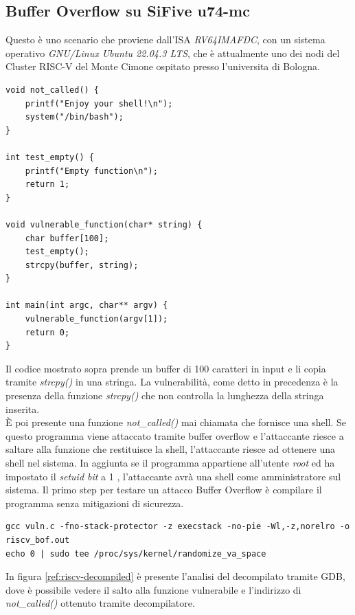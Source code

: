 \subsection*{Buffer Overflow su SiFive u74-mc}
Questo è uno scenario che proviene dall'ISA \textit{RV64IMAFDC}, con un sistema operativo \textit{GNU/Linux Ubuntu 22.04.3 LTS}, che è attualmente uno dei nodi del Cluster RISC-V del Monte Cimone ospitato presso l'universita di Bologna\cite{mcimone}.\\
\begin{verbatim}
void not_called() {
    printf("Enjoy your shell!\n");
    system("/bin/bash");
}

int test_empty() {
    printf("Empty function\n");
    return 1;
}

void vulnerable_function(char* string) {
    char buffer[100];
    test_empty();
    strcpy(buffer, string);
}

int main(int argc, char** argv) {
    vulnerable_function(argv[1]);
    return 0;
}
\end{verbatim}
Il codice mostrato sopra prende un buffer di 100 caratteri in input e li copia tramite \textit{strcpy()} in una stringa. La vulnerabilità, come detto in precedenza è la presenza della funzione \textit{strcpy()} che non controlla la lunghezza della stringa inserita.\\
È poi presente una funzione \textit{not\_called()} mai chiamata che fornisce una shell. Se questo programma viene attaccato tramite buffer overflow e l'attaccante riesce a saltare alla funzione che restituisce la shell, l'attaccante riesce ad ottenere una shell nel sistema. In aggiunta se il programma appartiene all'utente \textit{root} ed ha impostato il \textit{setuid bit} a 1 \cite{cbtnuggets}, l'attaccante avrà una shell come amministratore sul sistema.
Il primo step per testare un attacco Buffer Overflow è compilare il programma senza mitigazioni di sicurezza.
\begin{verbatim}
gcc vuln.c -fno-stack-protector -z execstack -no-pie -Wl,-z,norelro -o riscv_bof.out
echo 0 | sudo tee /proc/sys/kernel/randomize_va_space
\end{verbatim}
In figura \ref{ref:riscv-decompiled} è presente l'analisi del decompilato tramite GDB, dove è possibile vedere il salto alla funzione vulnerabile e l'indirizzo di \textit{not\_called()} ottenuto tramite decompilatore.
\vspace{1cm}
\FloatBarrier
